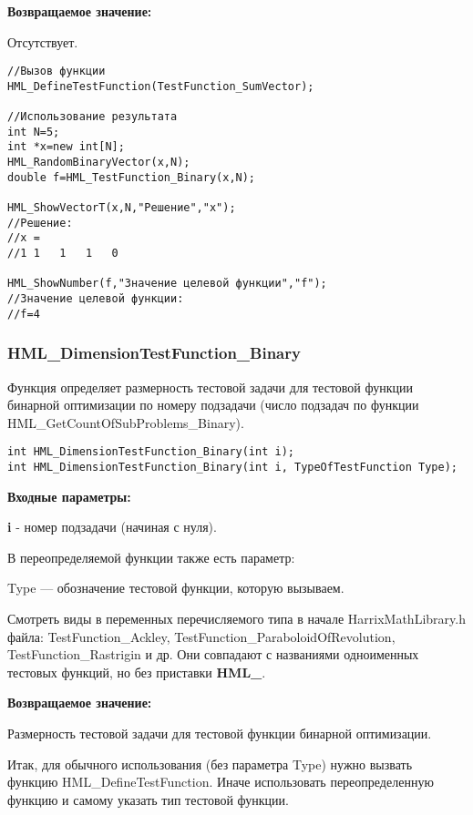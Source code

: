 \documentclass[a4paper,12pt]{article}
\begin{document}
\textbf{Возвращаемое значение:}
 
Отсутствует.


\begin{lstlisting}[label=code_use_HML_DefineTestFunction,caption=Пример использования]
//Вызов функции
HML_DefineTestFunction(TestFunction_SumVector);

//Использование результата
int N=5;
int *x=new int[N];
HML_RandomBinaryVector(x,N);
double f=HML_TestFunction_Binary(x,N);

HML_ShowVectorT(x,N,"Решение","x");
//Решение:
//x =	
//1	1	1	1	0

HML_ShowNumber(f,"Значение целевой функции","f");
//Значение целевой функции:
//f=4
\end{lstlisting}

\subsubsection{HML\_DimensionTestFunction\_Binary}\label{HML_DimensionTestFunction_Binary}

Функция определяет размерность тестовой задачи для тестовой функции бинарной оптимизации по номеру подзадачи (число подзадач по функции HML\_GetCountOfSubProblems\_Binary).


\begin{lstlisting}[label=code_syntax_HML_DimensionTestFunction_Binary,caption=Синтаксис]
int HML_DimensionTestFunction_Binary(int i);
int HML_DimensionTestFunction_Binary(int i, TypeOfTestFunction Type);
\end{lstlisting}

\textbf{Входные параметры:}

\textbf{i} - номер подзадачи (начиная с нуля).

В переопределяемой функции также есть параметр:
  
Type --- обозначение тестовой функции, которую вызываем. 

Смотреть виды в переменных перечисляемого типа в начале HarrixMathLibrary.h файла: TestFunction\_Ackley, TestFunction\_ParaboloidOfRevolution, TestFunction\_Rastrigin и др. Они совпадают с названиями одноименных тестовых функций, но без приставки \textbf{HML\_}.

\textbf{Возвращаемое значение:}
 
Размерность тестовой задачи для тестовой функции бинарной оптимизации.

Итак, для обычного использования (без параметра Type) нужно вызвать функцию HML\_DefineTestFunction. Иначе использовать переопределенную функцию и самому указать тип тестовой функции.
\end{document}
